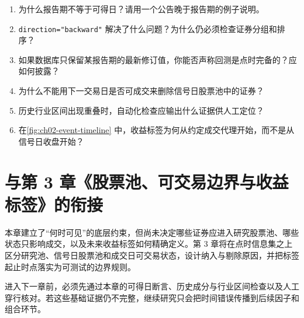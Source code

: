 \begin{quizbox}
\begin{enumerate}
  \item 为什么报告期不等于可得日？请用一个公告晚于报告期的例子说明。
  \item \texttt{direction="backward"} 解决了什么问题？为什么仍必须检查证券分组和排序？
  \item 如果数据库只保留某报告期的最新修订值，你能否声称回测是点时完备的？应如何披露？
  \item 为什么不能用下一交易日是否可成交来删除信号日股票池中的证券？
  \item 历史行业区间出现重叠时，自动化检查应输出什么证据供人工定位？
  \item 在\cref{fig:ch02-event-timeline} 中，收益标签为何从约定成交代理开始，而不是从信号日收盘开始？
\end{enumerate}
\end{quizbox}

\section{与第 3 章《股票池、可交易边界与收益标签》的衔接}

本章建立了“何时可见”的底层约束，但尚未决定哪些证券应进入研究股票池、哪些状态只影响成交，以及未来收益标签如何精确定义。第 3 章将在点时信息集之上区分研究池、信号日股票池和成交日可交易状态，设计纳入与剔除原因，并把标签起止时点落实为可测试的边界规则。

进入下一章前，必须先通过本章的可得日断言、历史成分与行业区间检查以及人工穿行核对。若这些基础证据仍不完整，继续研究只会把时间错误传播到后续因子和组合环节。
